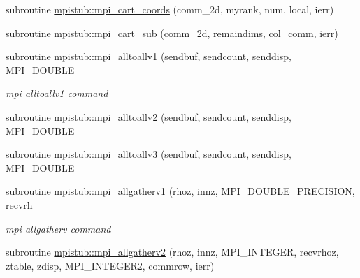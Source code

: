 \begin{DoxyCompactItemize}
\item 
subroutine \mbox{\hyperlink{namespacempistub_a599bb38fd4a9f405ced50d48c09116ca}{mpistub\+::mpi\+\_\+cart\+\_\+coords}} (comm\+\_\+2d, myrank, num, local, ierr)
\item 
subroutine \mbox{\hyperlink{namespacempistub_ab9ac48f74bbcdf05669e63852a220c09}{mpistub\+::mpi\+\_\+cart\+\_\+sub}} (comm\+\_\+2d, remaindims, col\+\_\+comm, ierr)
\item 
subroutine \mbox{\hyperlink{namespacempistub_aa93ced1f07150fe7c8d11a35a0b77b1f}{mpistub\+::mpi\+\_\+alltoallv1}} (sendbuf, sendcount, senddisp, M\+P\+I\+\_\+\+D\+O\+U\+B\+L\+E\+\_\+
\begin{DoxyCompactList}\small\item\em mpi alltoallv1 command \end{DoxyCompactList}\item 
subroutine \mbox{\hyperlink{namespacempistub_ac85c372d1990a0cfd2b6cb31a0be0b47}{mpistub\+::mpi\+\_\+alltoallv2}} (sendbuf, sendcount, senddisp, M\+P\+I\+\_\+\+D\+O\+U\+B\+L\+E\+\_\+
\item 
subroutine \mbox{\hyperlink{namespacempistub_a9e2b2b4a1d6bda704e33a2acfcfb9cfd}{mpistub\+::mpi\+\_\+alltoallv3}} (sendbuf, sendcount, senddisp, M\+P\+I\+\_\+\+D\+O\+U\+B\+L\+E\+\_\+
\item 
subroutine \mbox{\hyperlink{namespacempistub_a35fa927935bbf54e76460692ed2ae189}{mpistub\+::mpi\+\_\+allgatherv1}} (rhoz, innz, M\+P\+I\+\_\+\+D\+O\+U\+B\+L\+E\+\_\+\+P\+R\+E\+C\+I\+S\+I\+ON, recvrh
\begin{DoxyCompactList}\small\item\em mpi allgatherv command \end{DoxyCompactList}\item 
subroutine \mbox{\hyperlink{namespacempistub_a107fe42e9088982af86dbfe11fe0ac33}{mpistub\+::mpi\+\_\+allgatherv2}} (rhoz, innz, M\+P\+I\+\_\+\+I\+N\+T\+E\+G\+ER, recvrhoz, ztable, zdisp, M\+P\+I\+\_\+\+I\+N\+T\+E\+G\+E\+R2, commrow, ierr)
\end{DoxyCompactItemize}
